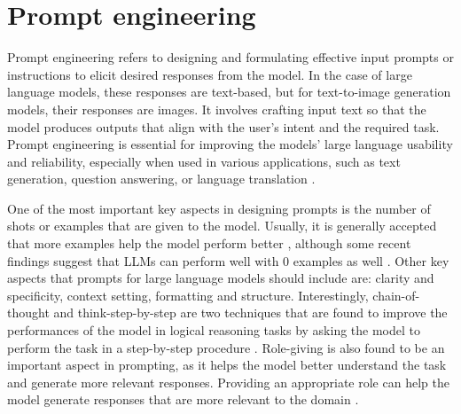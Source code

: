 \section{Prompt engineering}

Prompt engineering refers to designing and formulating effective input prompts or instructions to elicit desired responses from the model. In the case of large language models, these responses are text-based, but for text-to-image generation models, their responses are images. It involves crafting input text so that the model produces outputs that align with the user's intent and the required task. Prompt engineering is essential for improving the models' large language usability and reliability, especially when used in various applications, such as text generation, question answering, or language translation \cite{white2023prompt,zhou2022learning,oppenlaender2022prompt,reynolds2021prompt,zhou-etal-2022-prompt}. 

One of the most important key aspects in designing prompts is the number of shots or examples that are given to the model. Usually, it is generally accepted that more examples help the model perform better \cite{brown2020language,reynolds2021prompt,prompt-learn,promt-eng}, although some recent findings suggest that LLMs can perform well with 0 examples as well \cite{NEURIPS2022_8bb0d291}. Other key aspects that prompts for large language models should include are: clarity and specificity, context setting, formatting and structure. Interestingly, chain-of-thought and think-step-by-step are two techniques that are found to improve the performances of the model in logical reasoning tasks by asking the model to perform the task in a step-by-step procedure \cite{wei2023chainofthought,hsieh2023distilling}.
Role-giving is also found to be an important aspect in prompting, as it helps the model better understand the task and generate more relevant responses. Providing an appropriate role can help the model generate responses that are more relevant to the domain \cite{prompt-learn}.

